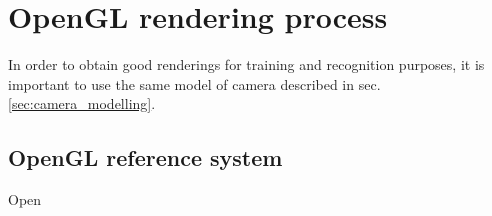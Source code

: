 \section{OpenGL rendering process} \label{sec:opengl-rendering}
In order to obtain good renderings for training and recognition purposes, it is
important to use the same model of camera described in sec.
\ref{sec:camera_modelling}.

\subsection{OpenGL reference system}
Open
